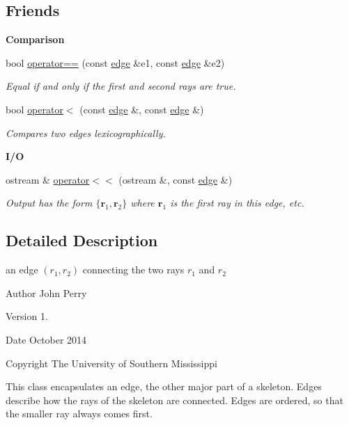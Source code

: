 \subsection*{Friends}
\begin{Indent}\textbf{ Comparison}\par
\begin{DoxyCompactItemize}
\item 
bool \hyperlink{classedge_a87086330455166d1fe4bb71be060fbcc}{operator==} (const \hyperlink{classedge}{edge} \&e1, const \hyperlink{classedge}{edge} \&e2)
\begin{DoxyCompactList}\small\item\em Equal if and only if the first and second rays are true. \end{DoxyCompactList}\item 
bool \hyperlink{classedge_a983f5438e6720d3bc1d7763c0c04fcae}{operator$<$} (const \hyperlink{classedge}{edge} \&, const \hyperlink{classedge}{edge} \&)
\begin{DoxyCompactList}\small\item\em Compares two edges lexicographically. \end{DoxyCompactList}\end{DoxyCompactItemize}
\end{Indent}
\begin{Indent}\textbf{ I/O}\par
\begin{DoxyCompactItemize}
\item 
\mbox{\label{classedge_aad6bb96213a9839cb6b32592a4105f53}} 
ostream \& \hyperlink{classedge_aad6bb96213a9839cb6b32592a4105f53}{operator$<$$<$} (ostream \&, const \hyperlink{classedge}{edge} \&)
\begin{DoxyCompactList}\small\item\em Output has the form $ \{ \mathbf{r}_1, \mathbf{r}_2 \} $ where $ \mathbf{r}_1 $ is the first ray in this edge, etc. \end{DoxyCompactList}\end{DoxyCompactItemize}
\end{Indent}


\subsection{Detailed Description}
an edge $(r_1,r_2)$ connecting the two rays $ r_1 $ and $ r_2 $ 

\begin{DoxyAuthor}{Author}
John Perry 
\end{DoxyAuthor}
\begin{DoxyVersion}{Version}
1. 
\end{DoxyVersion}
\begin{DoxyDate}{Date}
October 2014 
\end{DoxyDate}
\begin{DoxyCopyright}{Copyright}
The University of Southern Mississippi
\end{DoxyCopyright}
This class encapsulates an edge, the other major part of a skeleton. Edges describe how the rays of the skeleton are connected. Edges are ordered, so that the smaller ray always comes first.

